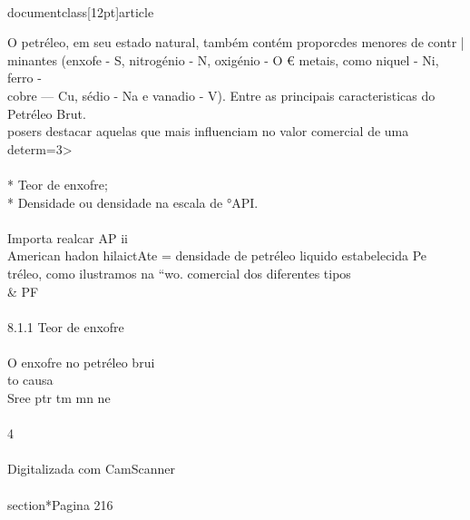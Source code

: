 \\documentclass[12pt]{article}
\begin{document}
O petréleo, em seu estado natural, também contém proporcdes menores de contr |\\
minantes (enxofe - S, nitrogénio - N, oxigénio - O € metais, como niquel - Ni, ferro -\\
cobre — Cu, sédio - Na e vanadio - V). Entre as principais caracteristicas do Petréleo Brut.\\
posers destacar aquelas que mais influenciam no valor comercial de uma determ=3>\\
\\
* Teor de enxofre;\\
* Densidade ou densidade na escala de °API.\\
\\
Importa realcar AP ii\\
American hadon hilaictAte = densidade de petréleo liquido estabelecida Pe\\
tréleo, como ilustramos na “wo. comercial dos diferentes tipos \\& PF\\
\\
8.1.1 Teor de enxofre\\
\\
O enxofre no petréleo brui\\
to causa\\
Sree ptr tm mn ne\\
\\
4\\
\\
Digitalizada com CamScanner\\

\\section*{Pagina 216}
\end{document}
